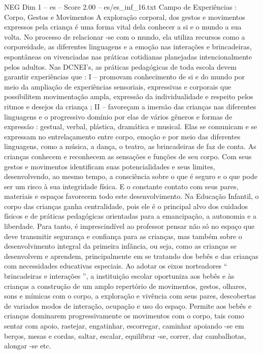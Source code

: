 \begin{textsample}{NEG Dim 1 – es – Score 2.00 – es/es\_inf\_16.txt}  \label{ex:f1_neg_093}
Campo de Experiências : Corpo, Gestos e Movimentos A exploração corporal, dos gestos e movimentos expressos pela criança é uma forma vital dela conhecer a si e o mundo a sua volta.
No processo de relacionar -se com o mundo, ela utiliza recursos como a corporeidade, as diferentes linguagens e a emoção nas interações e brincadeiras, espontâneas ou vivenciadas nas práticas cotidianas planejadas intencionalmente pelos adultos.
Nas DCNEI’s, as práticas pedagógicas de toda escola devem garantir experiências que : I – promovam conhecimento de si e do mundo por meio da ampliação de experiências sensoriais, expressivas e corporais que possibilitem movimentação ampla, expressão da individualidade e respeito pelos ritmos e desejos da criança ; II – favoreçam a imersão das crianças nas diferentes linguagens e o progressivo domínio por elas de vários gêneros e formas de expressão : gestual, verbal, plástica, dramática e musical.
Elas se comunicam e se expressam no entrelaçamento entre corpo, emoção e por meio das diferentes linguagens, como a música, a dança, o teatro, as brincadeiras de faz de conta.
As crianças conhecem e reconhecem as sensações e funções de seu corpo.
Com seus gestos e movimentos identificam suas potencialidades e seus limites, desenvolvendo, ao mesmo tempo, a consciência sobre o que é seguro e o que pode ser um risco à sua integridade física.
E o constante contato com seus pares, materiais e espaços favorecem todo este desenvolvimento.
Na Educação Infantil, o corpo das crianças ganha centralidade, pois ele é o principal alvo dos cuidados físicos e de práticas pedagógicas orientadas para a emancipação, a autonomia e a liberdade.
Para tanto, é imprescindível ao professor pensar não só no espaço que deve transmitir segurança e confiança para as crianças, mas também sobre o desenvolvimento integral da primeira infância, ou seja, como as crianças se desenvolvem e aprendem, principalmente em se tratando dos bebês e das crianças com necessidades educativas especiais.
Ao adotar os eixos norteadores “ brincadeiras e interações ”, a instituição escolar oportuniza aos bebês e às crianças a construção de um amplo repertório de movimentos, gestos, olhares, sons e mímicas com o corpo, a exploração e vivência com seus pares, descobertas de variados modos de interação, ocupação e uso do espaço.
Permite aos bebês e crianças dominarem progressivamente os movimentos com o corpo, tais como sentar com apoio, rastejar, engatinhar, escorregar, caminhar apoiando -se em berços, mesas e cordas, saltar, escalar, equilibrar -se, correr, dar cambalhotas, alongar -se etc.

\end{textsample}
